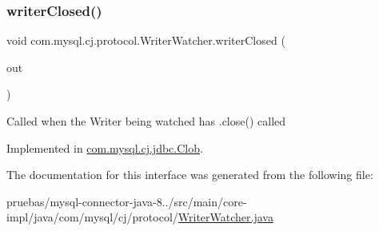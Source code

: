 \subsubsection{\texorpdfstring{writer\+Closed()}{writerClosed()}}
{\footnotesize\ttfamily void com.\+mysql.\+cj.\+protocol.\+Writer\+Watcher.\+writer\+Closed (\begin{DoxyParamCaption}\item[{\mbox{\hyperlink{classcom_1_1mysql_1_1cj_1_1protocol_1_1_watchable_writer}{Watchable\+Writer}}}]{out }\end{DoxyParamCaption})}

Called when the Writer being watched has .close() called 

Implemented in \mbox{\hyperlink{classcom_1_1mysql_1_1cj_1_1jdbc_1_1_clob_ab6d96b9b821f777e7b25850ceb480c2b}{com.\+mysql.\+cj.\+jdbc.\+Clob}}.



The documentation for this interface was generated from the following file\+:\begin{DoxyCompactItemize}
\item 
pruebas/mysql-\/connector-\/java-\/8../src/main/core-\/impl/java/com/mysql/cj/protocol/\mbox{\hyperlink{_writer_watcher_8java}{Writer\+Watcher.\+java}}\end{DoxyCompactItemize}
